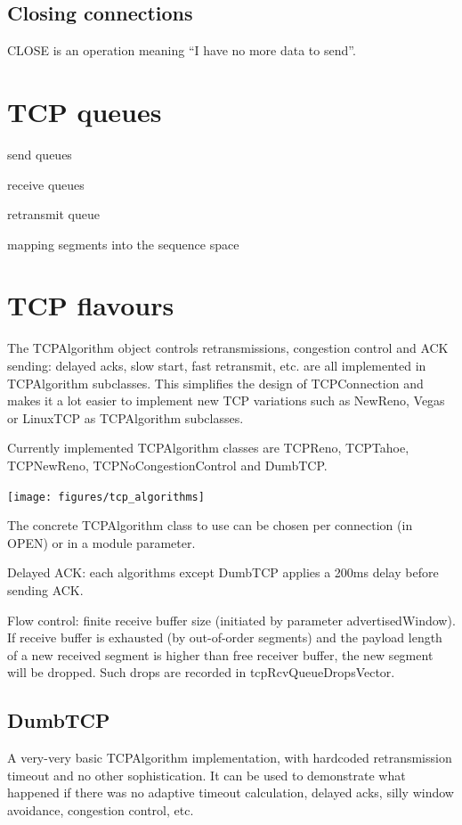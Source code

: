 \subsection{Closing connections}

CLOSE is an operation meaning ``I have no more data to send''.


\section{TCP queues}

send queues

receive queues

retransmit queue

mapping segments into the sequence space


\section{TCP flavours}
\label{sec:tcp_flavours}

The TCPAlgorithm object controls
retransmissions, congestion control and ACK sending: delayed acks, slow start,
fast retransmit, etc. are all implemented in TCPAlgorithm subclasses.
This simplifies the design of TCPConnection and makes it a lot easier to
implement new TCP variations such as NewReno, Vegas or LinuxTCP as
TCPAlgorithm subclasses.

Currently implemented TCPAlgorithm classes are TCPReno, TCPTahoe, TCPNewReno,
TCPNoCongestionControl and DumbTCP.

\texttt{[image: figures/tcp\_algorithms]}

The concrete TCPAlgorithm class to use can be chosen per connection (in OPEN)
or in a module parameter.

Delayed ACK: each algorithms except DumbTCP applies a 200ms delay
before sending ACK.

Flow control: finite receive buffer size (initiated by parameter
advertisedWindow). If receive buffer is exhausted (by out-of-order
segments) and the payload length of a new received segment
is higher than free receiver buffer, the new segment will be dropped.
Such drops are recorded in tcpRcvQueueDropsVector.

\subsection{DumbTCP}

A very-very basic TCPAlgorithm implementation, with hardcoded
retransmission timeout and no other sophistication. It can be
used to demonstrate what happened if there was no adaptive
timeout calculation, delayed acks, silly window avoidance,
congestion control, etc.

